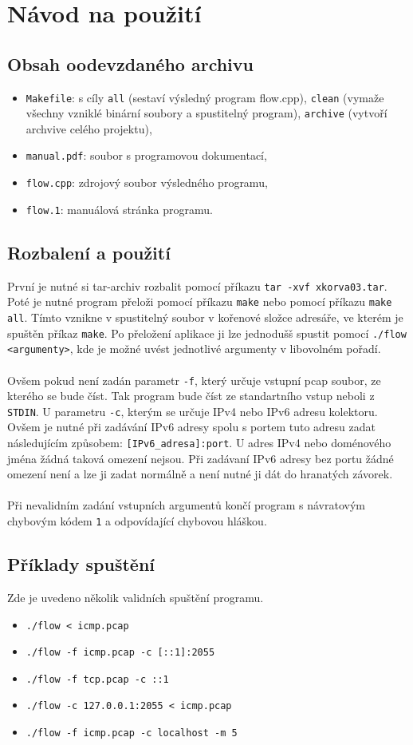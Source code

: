 \documentclass[12pt]{article}
\begin{document}
\section{Návod na použití}
\subsection{Obsah oodevzdaného archivu}
\begin{itemize}
	\item {\texttt{Makefile}: s cíly \texttt{all} (sestaví výsledný program flow.cpp), \texttt{clean} (vymaže všechny vzniklé binární soubory a spustitelný program), \texttt{archive} (vytvoří archvive celého projektu),}
	\item {\texttt{manual.pdf}: soubor s programovou dokumentací,}
	\item {\texttt{flow.cpp}: zdrojový soubor výsledného programu,}
	\item {\texttt{flow.1}: manuálová stránka programu.}
\end{itemize}
\subsection{Rozbalení a použití}
První je nutné si tar-archiv rozbalit pomocí příkazu \texttt{tar -xvf xkorva03.tar}. Poté je nutné program přeloži pomocí příkazu \texttt{make} nebo
pomocí příkazu \texttt{make all}. Tímto vznikne v spustitelný soubor v kořenové složce adresáře, ve kterém je spuštěn příkaz \texttt{make}. 
Po přeložení aplikace ji lze jednodušš spustit pomocí \texttt{./flow <argumenty>}, kde je možné uvést jednotlivé argumenty v libovolném pořadí.
\\\\ 
Ovšem pokud není zadán parametr \texttt{-f}, který určuje vstupní pcap soubor, ze kterého se bude číst. Tak program bude číst ze standartního vstup neboli z \texttt{STDIN}.  
U parametru \texttt{-c}, kterým se určuje IPv4 nebo IPv6 adresu kolektoru. Ovšem je nutné při zadávání IPv6 adresy spolu s portem tuto adresu zadat následujícím způsobem: \texttt{[IPv6\_adresa]:port}. U adres IPv4 nebo doménového jména žádná taková omezení nejsou.
Při zadávaní IPv6 adresy bez portu žádné omezení není a lze ji zadat normálně a není nutné ji dát do hranatých závorek.
\\\\
Při nevalidním zadání vstupních argumentů končí program s návratovým chybovým kódem \texttt{1} a odpovídající chybovou hláškou.
\subsection*{Příklady spuštění}
Zde je uvedeno několik validních spuštění programu.
\begin{itemize}
	\item \texttt{./flow < icmp.pcap}
	\item \texttt{./flow -f icmp.pcap -c [::1]:2055}
	\item \texttt{./flow -f tcp.pcap -c ::1}
	\item \texttt{./flow -c 127.0.0.1:2055 < icmp.pcap}
	\item \texttt{./flow -f icmp.pcap -c localhost -m 5}
\end{itemize}
\pagebreak
\end{document}
